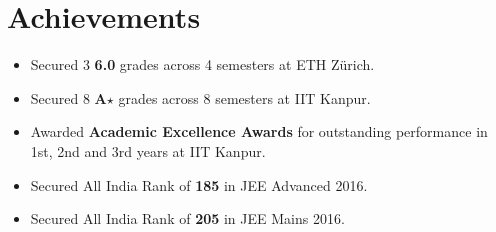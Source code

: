 \section*{Achievements}
\begin{itemize}[leftmargin=*,itemsep=0mm,label={\footnotesize\textbullet}]

\item Secured 3 \textbf{6.0} grades across 4 semesters at ETH Zürich.
\item Secured 8 \textbf{A$\star$} grades across 8 semesters at IIT Kanpur.
\item Awarded \textbf{Academic Excellence Awards} for outstanding performance in 1st, 2nd and 3rd years at IIT Kanpur.
\item Secured All India Rank of \textbf{185} in JEE Advanced 2016.
\item Secured All India Rank of \textbf{205} in JEE Mains 2016.

\end{itemize}
